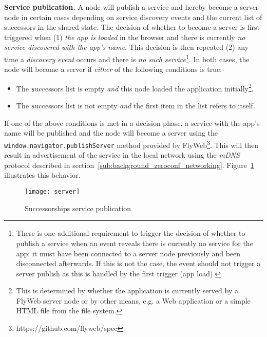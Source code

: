 \noindent\textbf{Service publication.}
A \APIshort node will publish a service and hereby become a server node in certain cases depending on service discovery events and the current list of successors in the shared state. 
The decision of whether to become a server is first triggered when (1) \textit{the app is loaded} in the browser and there is currently \textit{no service discovered with the app's name}. 
This decision is then repeated (2) any time a \textit{discovery event} occurs and there is \textit{no such service}\footnote{There is one additional requirement to trigger the decision of whether to publish a service when an event reveals there is currently no service for the app: it must have been connected to a server node previously and been disconnected afterwards. 
If this is not the case, the event should not trigger a server publish as this is handled by the first trigger (app load).}. 
In both cases, the node will become a server if \textit{either} of the following conditions is true:
\begin{itemize}
    \item The \texttt successors list is empty \textit{and} this node loaded the application initially\footnote{This is determined by whether the application is currently served by a FlyWeb server node or by other means, e.g. a Web application or a simple HTML file from the file system.}.
    \item The \texttt successors list is not empty \textit{and} the first item in the list refers to itself.
\end{itemize}

If one of the above conditions is met in a decision phase, a service with the app's name will be published and the node will become a server using the \texttt{window.navigator.publishServer} method provided by FlyWeb\footnote{https://github.com/flyweb/spec}. 
This will then result in advertisement of the service in the local network using the \textit{mDNS} protocol described in section~\ref{sub:background_zeroconf_networking}. 
Figure~\ref{fig:server} illustrates this behavior.

\begin{figure}[h]
    \centering
    \texttt{[image: server]}
    \caption{Successorships service publication}
    \label{fig:server}
\end{figure}

